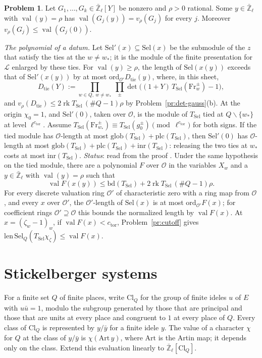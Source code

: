 \documentclass[reqno]{amsart}
\theoremstyle{definition}
\newtheorem{problem}{Problem}[section]
\theoremstyle{plain}
\newcommand{\Zl}{\bar{\mathbb{Z}}_\ell}
\newcommand{\Sel}{\mathrm{Sel}}
\newcommand{\val}{\operatorname{val}}
\newcommand{\ord}{\mathrm{ord}}
\newcommand{\rk}{\operatorname{rk}}
\newcommand{\Oc}{\mathcal{O}}
\newcommand{\bd}{\mathrm{bd}}
\newcommand{\TS}{T_{\mathrm{Sel}}}
\newcommand{\ctor}{c_{\mathrm{tor}}}
\newcommand{\Fr}{\mathrm{Fr}}
\begin{document}
\begin{problem}\label{pr:generic}
Let \(G_1, \dots, G_k \in \Zl[Y]\) be nonzero and \(\rho > 0\) rational.  Some \(y \in \Zl\) with \(\val(y) = \rho\) has \(\val(G_j(y)) = v_\rho(G_j)\) for every \(j\).  Moreover \(v_\rho(G_j) \le \val(G_j(0))\).
\end{problem}

\emph{The polynomial of a datum.}  Let \(\Sel'(x) \subseteq \Sel(x)\) be the submodule of the \(z\) that satisfy the ties at the \(w \ne w_*\); it is the module of the finite presentation for \(\mathcal L\) enlarged by these ties.  For \(\val(y) \ge \rho\), the length of \(\Sel(x(y))\) exceeds that of \(\Sel'(x(y))\) by at most \(\ord_{\Oc'} D_{\mathrm{tie}}(y)\), where, in this sheet,
\[
  D_{\mathrm{tie}}(Y) := \prod_{w \in Q,\ w \ne w_*}\ \prod_{\pm} \det\bigl((1 + Y)\,\TS(\Fr_w^{\pm}) - 1\bigr),
\]
and \(v_\rho(D_{\mathrm{tie}}) \le 2\rk \TS\,(\#Q - 1)\rho\) by Problem~\ref{pr:det-gauss}(b).
At the origin \(\chi_0 = 1\), and \(\Sel'(0)\), taken over \(\Oc\), is the module of \(\TS\) tied at \(Q \smallsetminus \{w_*\}\) at level \(\ell^{\ctor}\).  Assume \(\TS(\Fr_{w_*}^{\pm}) \equiv \TS(g_0^{\pm}) \pmod{\ell^{\ctor}}\) for both signs.  If the tied module has \(\Oc\)-length at most \(\mathrm{glob}(\TS) + \mathrm{plc}(\TS)\), then \(\Sel'(0)\) has \(\Oc\)-length at most \(\mathrm{glob}(\TS) + \mathrm{plc}(\TS) + \mathrm{inr}(\TS)\): releasing the two ties at \(w_*\) costs at most \(\mathrm{inr}(\TS)\).  \emph{Status}: read from the proof \cite{GL}.  Under the same hypothesis on the tied module, there are a polynomial \(F\) over \(\Oc\) in the variables \(X_w\) and a \(y \in \Zl\) with \(\val(y) = \rho\) such that
\[
  \val F(x(y)) \le \bd(\TS) + 2\rk \TS\,(\#Q - 1)\rho .
\]
For every discrete valuation ring \(\Oc'\) of characteristic zero with a ring map from \(\Oc\), and every \(x\) over \(\Oc'\), the \(\Oc'\)-length of \(\Sel(x)\) is at most \(\ord_{\Oc'} F(x)\); for coefficient rings \(\Oc' \supseteq \Oc\) this bounds the normalized length by \(\val F(x)\).  At \(x = (\zeta_w - 1)_w\), if \(\val F(x) < \ctor\), Problem~\ref{pr:cutoff} gives \(\mathrm{len}\,\Sel_Q(\TS\chi_\zeta) \le \val F(x)\).

\section{Stickelberger systems}\label{sec:systems}

For a finite set \(Q\) of finite places, write \(\mathrm{Cl}_Q\) for the group of finite ideles \(u\) of \(E\) with \(u\bar u = 1\), modulo the subgroup generated by those that are principal and those that are units at every place and congruent to \(1\) at every place of \(Q\).  Every class of \(\mathrm{Cl}_Q\) is represented by \(y/\bar y\) for a finite idele \(y\).  The value of a character \(\chi\) for \(Q\) at the class of \(y/\bar y\) is \(\chi(\mathrm{Art}\,y)\), where \(\mathrm{Art}\) is the Artin map; it depends only on the class.  Extend this evaluation linearly to \(\Zl[\mathrm{Cl}_Q]\).
\end{document}

